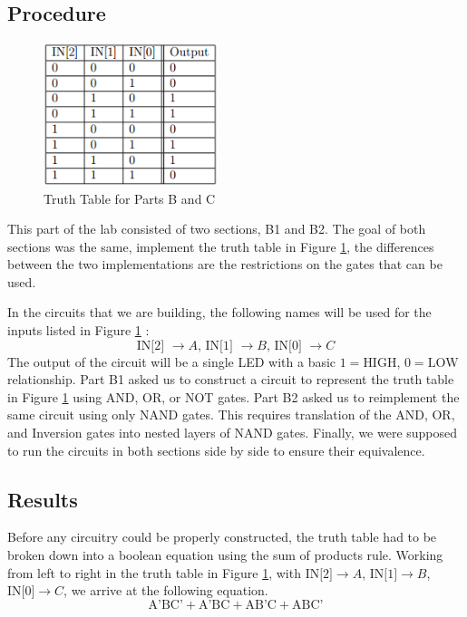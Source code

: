 \documentclass[a4paper,11pt]{article}
\begin{document}
\subsection{Procedure}

\begin{figure}
   \includegraphics[width=2in]{PartBTT}
   \caption{Truth Table for Parts B and C}
   \label{fig:partbtt}
\end{figure} 

This part of the lab consisted of two sections, B1 and B2. The goal of both sections was the same, implement the truth table in Figure \ref{fig:partbtt}, the differences between the two implementations are the restrictions on the gates that can be used. \par
In the circuits that we are building, the following names will be used for the inputs listed in Figure \ref{fig:partbtt} : 
\[ \text{IN[2] $\to A$, IN[1] $\to B$, IN[0] $\to C$} \] 
The output of the circuit will be a single LED with a basic $1 = \text{HIGH}$, $0 = \text{LOW}$ relationship. Part B1 asked us to construct a circuit to represent the truth table in Figure \ref{fig:partbtt} using AND, OR, or NOT gates. Part B2 asked us to reimplement the same circuit using only NAND gates. This requires translation of the AND, OR, and Inversion gates into nested layers of NAND gates. Finally, we were supposed to run the circuits in both sections side by side to ensure their equivalence. 

\subsection{Results}
Before any circuitry could be properly constructed, the truth table had to be broken down into a boolean equation using the sum of products rule. Working from left to right in the truth table in Figure \ref{fig:partbtt}, with $\text{IN[2]} \to A$, $\text{IN[1]} \to B$, $\text{IN[0]} \to C$, we arrive at the following equation.
 \begin{equation}\label{eq:one} \text{A'BC'} + \text{A'BC} + \text{AB'C} + \text{ABC'} \end{equation}
\end{document}
